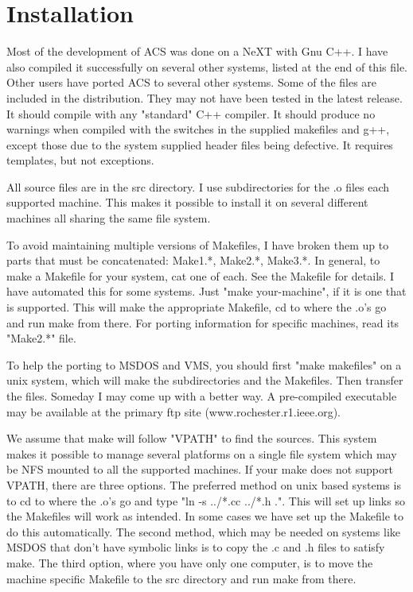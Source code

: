 \chapter{Installation}

Most of the development of ACS was done on a NeXT with Gnu C++.
I have also compiled it successfully on several other
systems, listed at the end of this file.  Other users have ported
ACS to several other systems.  Some of the files are included in
the distribution.  They may not have been tested in the latest
release.  It should compile with any "standard" C++ compiler.  It
should produce no warnings when compiled with the switches in the
supplied makefiles and g++, except those due to the system supplied
header files being defective.  It requires templates, but not
exceptions.

All source files are in the src directory.  I use subdirectories
for the .o files each supported machine.  This makes it possible
to install it on several different machines all sharing the same
file system.

To avoid maintaining multiple versions of Makefiles, I have broken
them up to parts that must be concatenated: Make1.*, Make2.*,
Make3.*.  In general, to make a Makefile for your system, cat one
of each.  See the Makefile for details.  I have automated this for
some systems.  Just "make your-machine", if it is one that is
supported.  This will make the appropriate Makefile, cd to where
the .o's go and run make from there.  For porting information for
specific machines, read its "Make2.*" file.

To help the porting to MSDOS and VMS, you should first "make
makefiles" on a unix system, which will make the subdirectories
and the Makefiles.  Then transfer the files.  Someday I may come
up with a better way.  A pre-compiled executable may be available at
the primary ftp site (www.rochester.r1.ieee.org).

We assume that make will follow "VPATH" to find the sources.  This
system makes it possible to manage several platforms on a single
file system which may be NFS mounted to all the supported machines.
If your make does not support VPATH, there are three options.  The
preferred method on unix based systems is to cd to where the
.o's go and type "ln -s ../*.cc ../*.h .".  This will set up links
so the Makefiles will work as intended.  In some cases we have set
up the Makefile to do this automatically.  The second method, which
may be needed on systems like MSDOS that don't have symbolic links
is to copy the .c and .h files to satisfy make.  The third option,
where you have only one computer, is to move the machine
specific Makefile to the src directory and run make from there.


